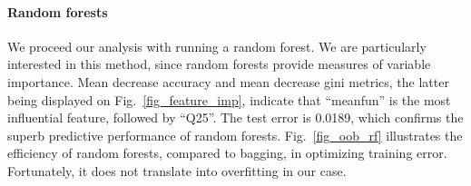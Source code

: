 \paragraph{Random forests}
We proceed our analysis with running a random forest. We are particularly interested in this method, since random forests provide measures of variable importance. Mean decrease accuracy and mean decrease gini metrics, the latter being displayed on Fig.~\ref{fig_feature_imp}, indicate that ``meanfun'' is the most influential feature, followed by ``Q25''. The test error is \num{0.0189}, which confirms the superb predictive performance of random forests. Fig.~\ref{fig_oob_rf} illustrates the efficiency of random forests, compared to bagging, in optimizing training error. Fortunately, it does not translate into overfitting in our case.
